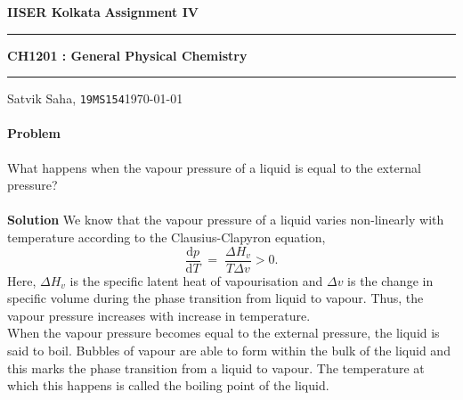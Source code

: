 \documentclass[10pt]{article}
\newcounter{prob}
\def\problem{\stepcounter{prob}\paragraph{Problem \arabic{prob}}}
\def\solution{\\\\\textbf{Solution }}
\begin{document}
        \par\textbf{IISER Kolkata} \hfill \textbf{Assignment IV}
        \vspace{3pt}
        \hrule
        \vspace{3pt}
        \begin{center}
                \LARGE{\textbf{CH1201 : General Physical Chemistry}}
        \end{center}
        \vspace{3pt}
        \hrule
        \vspace{3pt}
        Satvik Saha, \texttt{19MS154}\hfill\today
        \vspace{20pt}

        \problem What happens when the vapour pressure of a liquid is equal to the external pressure?
        \solution We know that the vapour pressure of a liquid varies non-linearly with temperature according to the Clausius-Clapyron equation,
        \[
        \frac{\mathrm{d} p}{\mathrm{d}T} \;=\; \frac{\Delta H_v}{T\Delta v} > 0.
        \]
        Here, $\Delta H_v$ is the specific latent heat of vapourisation and $\Delta v$ is the change in specific volume during the phase transition from
        liquid to vapour. Thus, the vapour pressure increases with increase in temperature. \\

        When the vapour pressure becomes equal to the external pressure, the liquid is said to boil. Bubbles of vapour are able to form within the
        bulk of the liquid and this marks the phase transition from a liquid to vapour. The temperature at which this happens is called the boiling
        point of the liquid.
\end{document}
